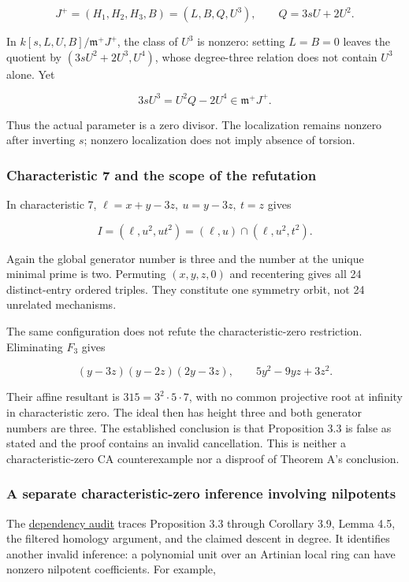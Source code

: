\documentclass[
  british,
  10pt,
]{article}
\begin{document}
\[
J^+=(H_1,H_2,H_3,B)=(L,B,Q,U^3),\qquad Q=3sU+2U^2.
\]

In \(k[s,L,U,B]/\mathfrak m^+J^+\), the class of \(U^3\) is nonzero:
setting \(L=B=0\) leaves the quotient by \((3sU^2+2U^3,U^4)\), whose
degree-three relation does not contain \(U^3\) alone. Yet

\[
3sU^3=U^2Q-2U^4\in\mathfrak m^+J^+.
\]

Thus the actual parameter is a zero divisor. The localization remains
nonzero after inverting \(s\); nonzero localization does not imply
absence of torsion.

\subsubsection{Characteristic 7 and the scope of the
refutation}\label{characteristic-7-and-the-scope-of-the-refutation}

In characteristic 7, \(\ell=x+y-3z,\ u=y-3z,\ t=z\) gives

\[
I=(\ell,u^2,ut^2)=(\ell,u)\cap(\ell,u^2,t^2).
\]

Again the global generator number is three and the number at the unique
minimal prime is two. Permuting \((x,y,z,0)\) and recentering gives all
24 distinct-entry ordered triples. They constitute one symmetry orbit,
not 24 unrelated mechanisms.

The same configuration does not refute the characteristic-zero
restriction. Eliminating \(F_3\) gives

\[
(y-3z)(y-2z)(2y-3z),\qquad5y^2-9yz+3z^2.
\]

Their affine resultant is \(315=3^2\cdot5\cdot7\), with no common
projective root at infinity in characteristic zero. The ideal then has
height three and both generator numbers are three. The established
conclusion is that Proposition 3.3 is false as stated and the proof
contains an invalid cancellation. This is neither a characteristic-zero
CA counterexample nor a disproof of Theorem A's conclusion.

\subsubsection{A separate characteristic-zero inference involving
nilpotents}\label{a-separate-characteristic-zero-inference-involving-nilpotents}

The \href{evidence/audit/DEPENDENCY_AUDIT.md}{dependency audit} traces
Proposition 3.3 through Corollary 3.9, Lemma 4.5, the filtered homology
argument, and the claimed descent in degree. It identifies another
invalid inference: a polynomial unit over an Artinian local ring can
have nonzero nilpotent coefficients. For example,
\end{document}
